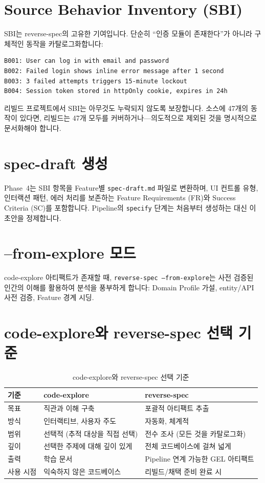 \documentclass[11pt,a4paper,openright,twoside]{report}
\newcommand{\file}[1]{\texttt{#1}}
\begin{document}
\section{Source Behavior Inventory (SBI)}

SBI는 reverse-spec의 고유한 기여입니다. 단순히 ``인증 모듈이 존재한다''가 아니라 구체적인 동작을 카탈로그화합니다:

\begin{lstlisting}[title={SBI Example}]
B001: User can log in with email and password
B002: Failed login shows inline error message after 1 second
B003: 3 failed attempts triggers 15-minute lockout
B004: Session token stored in httpOnly cookie, expires in 24h
\end{lstlisting}

리빌드 프로젝트에서 SBI는 아무것도 누락되지 않도록 보장합니다. 소스에 47개의 동작이 있다면, 리빌드는 47개 모두를 커버하거나---의도적으로 제외된 것을 명시적으로 문서화해야 합니다.

\section{spec-draft 생성}

Phase~4는 SBI 항목을 Feature별 \file{spec-draft.md} 파일로 변환하며, UI 컨트롤 유형, 인터랙션 패턴, 에러 처리를 보존하는 Feature Requirements (FR)와 Success Criteria (SC)를 포함합니다. Pipeline의 \texttt{specify} 단계는 처음부터 생성하는 대신 이 초안을 정제합니다.

\section{--from-explore 모드}

code-explore 아티팩트가 존재할 때, \texttt{reverse-spec --from-explore}는 사전 검증된 인간의 이해를 활용하여 분석을 풍부하게 합니다: Domain Profile 가설, entity/API 사전 검증, Feature 경계 시딩.

\section{code-explore와 reverse-spec 선택 기준}

\begin{table}[H]
\centering
\caption{code-explore와 reverse-spec 선택 기준}
\label{tab:explore-vs-reverse}
\begin{tabularx}{\textwidth}{lXX}
\toprule
\textbf{기준} & \textbf{code-explore} & \textbf{reverse-spec} \\
\midrule
목표 & 직관과 이해 구축 & 포괄적 아티팩트 추출 \\
방식 & 인터랙티브, 사용자 주도 & 자동화, 체계적 \\
범위 & 선택적 (추적 대상을 직접 선택) & 전수 조사 (모든 것을 카탈로그화) \\
깊이 & 선택한 주제에 대해 깊이 있게 & 전체 코드베이스에 걸쳐 넓게 \\
출력 & 학습 문서 & Pipeline 연계 가능한 GEL 아티팩트 \\
사용 시점 & 익숙하지 않은 코드베이스 & 리빌드/채택 준비 완료 시 \\
\bottomrule
\end{tabularx}
\end{table}
\end{document}
